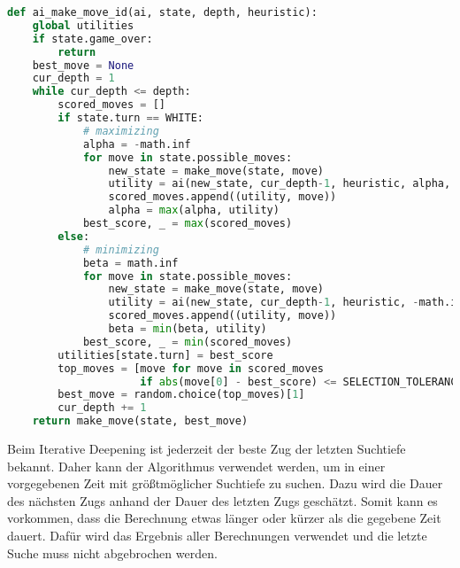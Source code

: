 \begin{lstlisting}[language=Python]
def ai_make_move_id(ai, state, depth, heuristic):
    global utilities
    if state.game_over:
        return
    best_move = None
    cur_depth = 1
    while cur_depth <= depth:
        scored_moves = []
        if state.turn == WHITE:
            # maximizing
            alpha = -math.inf
            for move in state.possible_moves:
                new_state = make_move(state, move)
                utility = ai(new_state, cur_depth-1, heuristic, alpha, math.inf)
                scored_moves.append((utility, move))
                alpha = max(alpha, utility)
            best_score, _ = max(scored_moves)
        else:
            # minimizing
            beta = math.inf
            for move in state.possible_moves:
                new_state = make_move(state, move)
                utility = ai(new_state, cur_depth-1, heuristic, -math.inf, beta)
                scored_moves.append((utility, move))
                beta = min(beta, utility)
            best_score, _ = min(scored_moves)
        utilities[state.turn] = best_score
        top_moves = [move for move in scored_moves
                     if abs(move[0] - best_score) <= SELECTION_TOLERANCE]
        best_move = random.choice(top_moves)[1]
        cur_depth += 1
    return make_move(state, best_move)
\end{lstlisting}

Beim Iterative Deepening ist jederzeit der beste Zug der letzten
Suchtiefe bekannt. Daher kann der Algorithmus verwendet werden, um in
einer vorgegebenen Zeit mit größtmöglicher Suchtiefe zu suchen. Dazu
wird die Dauer des nächsten Zugs anhand der Dauer des letzten Zugs
geschätzt. Somit kann es vorkommen, dass die Berechnung etwas länger
oder kürzer als die gegebene Zeit dauert. Dafür wird das Ergebnis aller
Berechnungen verwendet und die letzte Suche muss nicht abgebrochen
werden.

